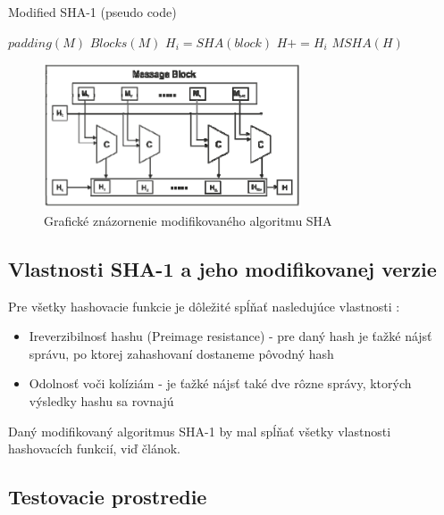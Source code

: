 \documentclass[conference]{IEEEtran}
\begin{document}
\begin{algorithm}
   \caption{Modified SHA-1 (pseudo code) \cite{MSHA}}
    \begin{algorithmic}[1]

        \State ${padding(M)}$ 
        \State ${Blocks(M)}$ 
	 
     		\State ${H_i = SHA(block)}$		
     	\EndFor
   	\State ${H += H_i}$    	
   	 ${MSHA(H)}$
   	\EndIf
       \EndFunction
\end{algorithmic}
\end{algorithm}


\begin{figure}[!h]
\centering
\includegraphics[width=3in]{img/MSHA}
\caption{Grafické znázornenie modifikovaného algoritmu SHA}
\end{figure}


\subsection{Vlastnosti SHA-1 a jeho modifikovanej verzie}

Pre všetky hashovacie funkcie je dôležité spĺňať nasledujúce vlastnosti \cite{CHF}:

\begin{itemize}
	\item{Ireverzibilnosť hashu (Preimage resistance) - pre daný hash je ťažké nájsť správu, po ktorej zahashovaní dostaneme pôvodný hash}
	\item{Odolnosť voči kolíziám - je ťažké nájsť také dve rôzne správy, ktorých výsledky hashu sa rovnajú}
\end{itemize}

Daný modifikovaný algoritmus SHA-1 by mal spĺňať všetky vlastnosti hashovacích funkcií, viď článok\cite{MSHA}.

\subsection{Testovacie prostredie}
\end{document}
